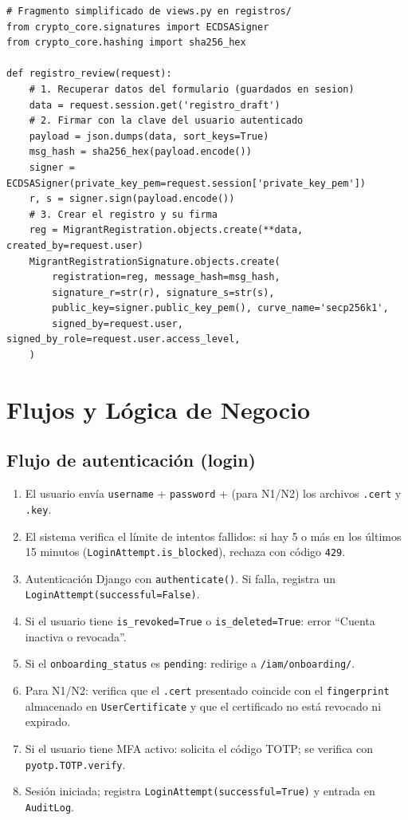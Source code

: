 \documentclass[10pt,letterpaper]{report}
\begin{document}
\begin{lstlisting}[style=python]
# Fragmento simplificado de views.py en registros/
from crypto_core.signatures import ECDSASigner
from crypto_core.hashing import sha256_hex

def registro_review(request):
    # 1. Recuperar datos del formulario (guardados en sesion)
    data = request.session.get('registro_draft')
    # 2. Firmar con la clave del usuario autenticado
    payload = json.dumps(data, sort_keys=True)
    msg_hash = sha256_hex(payload.encode())
    signer = ECDSASigner(private_key_pem=request.session['private_key_pem'])
    r, s = signer.sign(payload.encode())
    # 3. Crear el registro y su firma
    reg = MigrantRegistration.objects.create(**data, created_by=request.user)
    MigrantRegistrationSignature.objects.create(
        registration=reg, message_hash=msg_hash,
        signature_r=str(r), signature_s=str(s),
        public_key=signer.public_key_pem(), curve_name='secp256k1',
        signed_by=request.user, signed_by_role=request.user.access_level,
    )
\end{lstlisting}

\chapter{Flujos y Lógica de Negocio}

\section{Flujo de autenticación (login)}

\begin{enumerate}[leftmargin=*]
    \item El usuario envía \texttt{username} + \texttt{password} + (para N1/N2) los archivos \texttt{.cert} y \texttt{.key}.
    \item El sistema verifica el límite de intentos fallidos: si hay 5 o más en los últimos 15 minutos (\texttt{LoginAttempt.is\_blocked}), rechaza con código \texttt{429}.
    \item Autenticación Django con \texttt{authenticate()}. Si falla, registra un \texttt{LoginAttempt(successful=False)}.
    \item Si el usuario tiene \texttt{is\_revoked=True} o \texttt{is\_deleted=True}: error ``Cuenta inactiva o revocada''.
    \item Si el \texttt{onboarding\_status} es \texttt{pending}: redirige a \texttt{/iam/onboarding/}.
    \item Para N1/N2: verifica que el \texttt{.cert} presentado coincide con el \texttt{fingerprint} almacenado en \texttt{UserCertificate} y que el certificado no está revocado ni expirado.
    \item Si el usuario tiene MFA activo: solicita el código TOTP; se verifica con \texttt{pyotp.TOTP.verify}.
    \item Sesión iniciada; registra \texttt{LoginAttempt(successful=True)} y entrada en \texttt{AuditLog}.
\end{enumerate}
\end{document}
